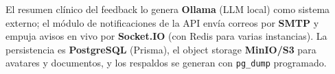 El resumen clínico del feedback lo genera \textbf{Ollama} (LLM local) como sistema externo; el módulo de notificaciones de la API envía correos por \textbf{SMTP} y empuja avisos en vivo por \textbf{Socket.IO} (con Redis para varias instancias). La persistencia es \textbf{PostgreSQL} (Prisma), el object storage \textbf{MinIO/S3} para avatares y documentos, y los respaldos se generan con \texttt{pg\_dump} programado.